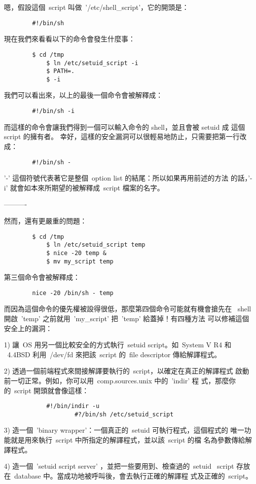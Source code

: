 \documentclass{article}
\begin{document}
\begin{CJK*}{Bg5}{ming}
	嗯，假設這個~script 叫做~'/etc/shell\_script'，它的開頭是：
\begin{verbatim}
		#!/bin/sh
\end{verbatim}
	現在我們來看看以下的命令會發生什麼事：
\begin{verbatim}
		$ cd /tmp
	        $ ln /etc/setuid_script -i
        	$ PATH=.
	        $ -i
\end{verbatim}
	我們可以看出來，以上的最後一個命令會被解釋成：
\begin{verbatim}
		#!/bin/sh -i
\end{verbatim}
	而這樣的命令會讓我們得到一個可以輸入命令的 shell，並且會被 setuid 成
        這個  script 的擁有者。
	幸好，這樣的安全漏洞可以很輕易地防止，只需要把第一行改成：
\begin{verbatim}
		#!/bin/sh -
\end{verbatim}
	'-' 這個符號代表著它是整個~option list 的結尾：所以如果再用前述的方法
        的話，'-i' 就會如本來所期望的被解釋成~script 檔案的名字。

        ----------

	然而，還有更嚴重的問題：
\begin{verbatim}
		$ cd /tmp
	        $ ln /etc/setuid_script temp
        	$ nice -20 temp &
	        $ mv my_script temp
\end{verbatim}
	第三個命令會被解釋成：
\begin{verbatim}
		nice -20 /bin/sh - temp
\end{verbatim}
	而因為這個命令的優先權被設得很低，那麼第四個命令可能就有機會搶先在 
	~shell 開啟~'temp' 之前就用~'my\_script' 把~'temp' 給蓋掉！有四種方法
        可以修補這個安全上的漏洞：

	1)  讓~OS 用另一個比較安全的方式執行~setuid script。如~System V R4 和 
	   ~4.4BSD 利用~/dev/fd 來把該~script 的~file descriptor 傳給解譯程式。

	2)  透過一個前端程式來間接解譯要執行的~script，以確定在真正的解譯程式
            啟動前一切正常。例如，你可以用~comp.sources.unix 中的~'indir' 程
            式，那麼你的~script 開頭就會像這樣：
\begin{verbatim}
			#!/bin/indir -u
	                #?/bin/sh /etc/setuid_script
\end{verbatim}
	3)  造一個~'binary wrapper'：一個真正的~setuid 可執行程式，這個程式的
            唯一功能就是用來執行~script 中所指定的解譯程式，並以該~script 的檔
            名為參數傳給解譯程式。

	4)  造一個~'setuid script server' ，並把一些要用到、檢查過的~setuid 
           ~script 存放在~database 中。當成功地被呼叫後，會去執行正確的解譯程
            式及正確的~script。


\end{CJK*}
\end{document}
